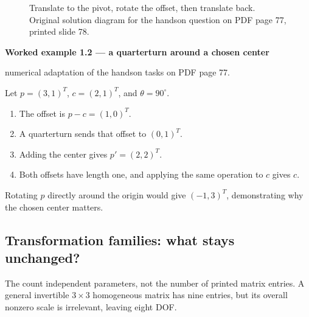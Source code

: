 \documentclass[letterpaper,11pt,english,openany,oneside]{jupyterBook}
\begin{document}
\begin{figure}[H]
\centering
\capstart

\noindent{}
\caption{Translate to the pivot, rotate the offset, then translate back. Original solution diagram for the hands\sphinxhyphen{}on question on PDF page 77, printed slide 78.}\label{\detokenize{lectures/lecture01/transformations:fig-lec01-pivot}}\end{figure}
\label{\detokenize{lectures/lecture01/transformations:ex-lec01-pivot}}
\begin{TextbookBox}
\textbf{Worked example 1.2 — a quarter\sphinxhyphen{}turn around a chosen center}\par\smallskip

\sphinxAtStartPar
{} numerical adaptation of the hands\sphinxhyphen{}on tasks on PDF page 77.

\sphinxAtStartPar
Let \(p=(3,1)^T\), \(c=(2,1)^T\), and \(\theta=90^\circ\).
\begin{enumerate}
%
\item {}
\sphinxAtStartPar
The offset is \(p-c=(1,0)^T\).

\item {}
\sphinxAtStartPar
A quarter\sphinxhyphen{}turn sends that offset to \((0,1)^T\).

\item {}
\sphinxAtStartPar
Adding the center gives \(p'=(2,2)^T\).

\item {}
\sphinxAtStartPar
Both offsets have length one, and applying the same operation to \(c\) gives \(c\).

\end{enumerate}

\sphinxAtStartPar
Rotating \(p\) directly around the origin would give \((-1,3)^T\), demonstrating why the chosen center matters.

\end{TextbookBox}


\subsection{Transformation families: what stays unchanged?}
\label{\detokenize{lectures/lecture01/transformations:transformation-families-what-stays-unchanged}}
\sphinxAtStartPar
The  count independent parameters, not the number of printed matrix entries. A general invertible \(3\times3\) homogeneous matrix has nine entries, but its overall nonzero scale is irrelevant, leaving eight DOF.
\end{document}
